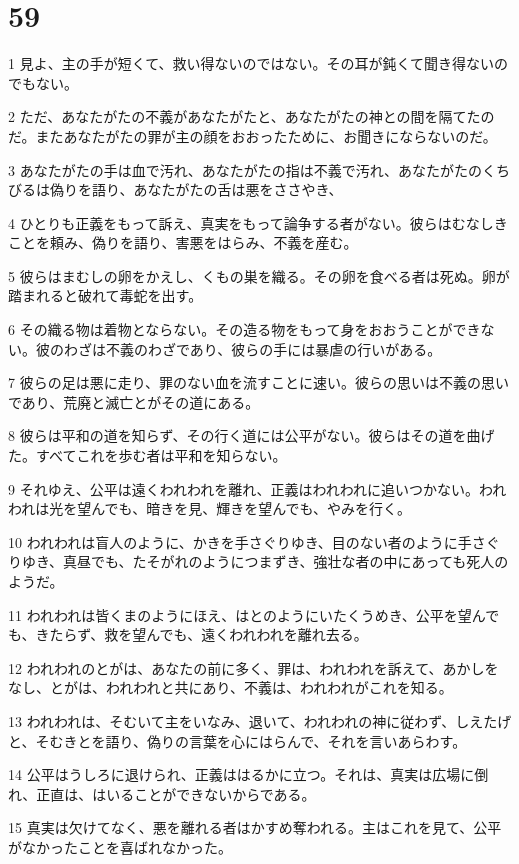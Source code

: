 \chapter{59}

\par 1 見よ、主の手が短くて、救い得ないのではない。その耳が鈍くて聞き得ないのでもない。
\par 2 ただ、あなたがたの不義があなたがたと、あなたがたの神との間を隔てたのだ。またあなたがたの罪が主の顔をおおったために、お聞きにならないのだ。
\par 3 あなたがたの手は血で汚れ、あなたがたの指は不義で汚れ、あなたがたのくちびるは偽りを語り、あなたがたの舌は悪をささやき、
\par 4 ひとりも正義をもって訴え、真実をもって論争する者がない。彼らはむなしきことを頼み、偽りを語り、害悪をはらみ、不義を産む。
\par 5 彼らはまむしの卵をかえし、くもの巣を織る。その卵を食べる者は死ぬ。卵が踏まれると破れて毒蛇を出す。
\par 6 その織る物は着物とならない。その造る物をもって身をおおうことができない。彼のわざは不義のわざであり、彼らの手には暴虐の行いがある。
\par 7 彼らの足は悪に走り、罪のない血を流すことに速い。彼らの思いは不義の思いであり、荒廃と滅亡とがその道にある。
\par 8 彼らは平和の道を知らず、その行く道には公平がない。彼らはその道を曲げた。すべてこれを歩む者は平和を知らない。
\par 9 それゆえ、公平は遠くわれわれを離れ、正義はわれわれに追いつかない。われわれは光を望んでも、暗きを見、輝きを望んでも、やみを行く。
\par 10 われわれは盲人のように、かきを手さぐりゆき、目のない者のように手さぐりゆき、真昼でも、たそがれのようにつまずき、強壮な者の中にあっても死人のようだ。
\par 11 われわれは皆くまのようにほえ、はとのようにいたくうめき、公平を望んでも、きたらず、救を望んでも、遠くわれわれを離れ去る。
\par 12 われわれのとがは、あなたの前に多く、罪は、われわれを訴えて、あかしをなし、とがは、われわれと共にあり、不義は、われわれがこれを知る。
\par 13 われわれは、そむいて主をいなみ、退いて、われわれの神に従わず、しえたげと、そむきとを語り、偽りの言葉を心にはらんで、それを言いあらわす。
\par 14 公平はうしろに退けられ、正義ははるかに立つ。それは、真実は広場に倒れ、正直は、はいることができないからである。
\par 15 真実は欠けてなく、悪を離れる者はかすめ奪われる。主はこれを見て、公平がなかったことを喜ばれなかった。
